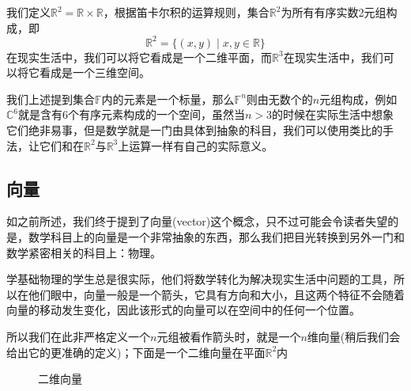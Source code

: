 我们定义$\mathbb{R}^2=\mathbb{R} \times \mathbb{R}$，根据笛卡尔积的运算规则，集合$\mathbb{R}^2$为所有有序实数2元组构成，即$$\mathbb{R}^2=\{(x,y)\mid x,y \in \mathbb{R}\}$$在现实生活中，我们可以将它看成是一个二维平面，而$\mathbb{R}^3$在现实生活中，我们可以将它看成是一个三维空间。

我们上述提到集合$\mathbb{F}$内的元素是一个标量，那么$\mathbb{F}^n$则由无数个的$n$元组构成，例如$\mathbb{C}^6$就是含有6个有序元素构成的一个空间，虽然当$n>3$的时候在实际生活中想象它们绝非易事，但是数学就是一门由具体到抽象的科目，我们可以使用类比的手法，让它们和在$\mathbb{R}^2$与$\mathbb{R}^3$上运算一样有自己的实际意义。

\subsection{向量}

如之前所述，我们终于提到了向量(vector)这个概念，只不过可能会令读者失望的是，数学科目上的向量是一个非常抽象的东西，那么我们把目光转换到另外一门和数学紧密相关的科目上：物理。

学基础物理的学生总是很实际，他们将数学转化为解决现实生活中问题的工具，所以在他们眼中，向量一般是一个箭头，它具有方向和大小，且这两个特征不会随着向量的移动发生变化，因此该形式的向量可以在空间中的任何一个位置。

所以我们在此非严格定义一个$n$元组被看作箭头时，就是一个$n$维向量(稍后我们会给出它的更准确的定义)；下面是一个二维向量在平面$\mathbb{R}^2$内

\begin{figure}[htbp]    %
		\centering            %
		\caption{二维向量}    %
		\label{fig:intro.vector}            %
\end{figure}

